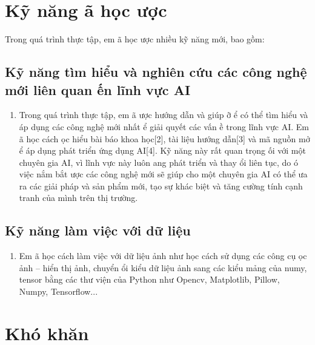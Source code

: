 \documentclass{article}
\begin{document}
\section{ Kỹ n\u{a}ng {\dj}\~{a} học {\dj}ược}

\noindent 

\noindent Trong qu\'{a} tr\`{i}nh thực tập, em {\dj}\~{a} học {\dj}ược nhiều kỹ n\u{a}ng mới, bao gồm:


\subsection{ Kỹ n\u{a}ng t\`{i}m hiểu v\`{a} nghi\^{e}n cứu c\'{a}c c\^{o}ng nghệ mới li\^{e}n quan {\dj}ến l\~{i}nh vực AI}

\begin{enumerate}
\item  Trong qu\'{a} tr\`{i}nh thực tập, em {\dj}\~{a} {\dj}ược hướng dẫn v\`{a} gi\'{u}p {\dj}ỡ {\dj}ể c\'{o} thể t\`{i}m hiểu v\`{a} \'{a}p dụng c\'{a}c c\^{o}ng nghệ mới nhất {\dj}ể giải quyết c\'{a}c vấn {\dj}ề trong l\~{i}nh vực AI. Em {\dj}\~{a} học c\'{a}ch {\dj}ọc hiểu b\`{a}i b\'{a}o khoa học[2], t\`{a}i liệu hướng dẫn[3] v\`{a} m\~{a} nguồn mở {\dj}ể \'{a}p dụng ph\'{a}t triển ứng dụng AI[4]. Kỹ n\u{a}ng n\`{a}y rất quan trọng {\dj}ối với một chuy\^{e}n gia AI, v\`{i} l\~{i}nh vực n\`{a}y lu\^{o}n {\dj}ang ph\'{a}t triển v\`{a} thay {\dj}ổi li\^{e}n tục, do {\dj}\'{o} việc nắm bắt {\dj}ược c\'{a}c c\^{o}ng nghệ mới sẽ gi\'{u}p cho một chuy\^{e}n gia AI c\'{o} thể {\dj}ưa ra c\'{a}c giải ph\'{a}p v\`{a} sản phẩm mới, tạo sự kh\'{a}c biệt v\`{a} t\u{a}ng cường t\'{i}nh cạnh tranh của m\`{i}nh tr\^{e}n thị trường.
\end{enumerate}


\subsection{ Kỹ n\u{a}ng l\`{a}m việc với dữ liệu}

\begin{enumerate}
\item  Em {\dj}\~{a} học c\'{a}ch l\`{a}m việc với dữ liệu ảnh như học c\'{a}ch sử dụng c\'{a}c c\^{o}ng cụ {\dj}ọc ảnh -- hiển thị ảnh, chuyển {\dj}ổi kiểu dữ liệu ảnh sang c\'{a}c kiểu mảng của numy, tensor bằng c\'{a}c thư viện của Python như Opencv, Matplotlib, Pillow, Numpy, Tensorflow...
\end{enumerate}


\section{ Kh\'{o} kh\u{a}n}
\end{document}
